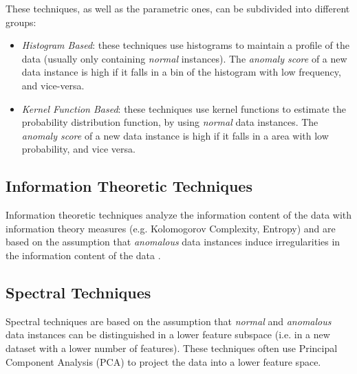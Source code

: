 These techniques, as well as the parametric ones, can be subdivided into different groups:

\begin{itemize}
	\item \textit{Histogram Based}: these techniques use histograms to maintain a profile of the data (usually only containing \textit{normal} instances). The \textit{anomaly score} of a new data instance is high if it falls in a bin of the histogram with low frequency, and vice-versa.
	\item \textit{Kernel Function Based}: these techniques use kernel functions to estimate the probability distribution function, by using \textit{normal} data instances. The \textit{anomaly score} of a new data instance is high if it falls in a area with low probability, and vice versa.
\end{itemize}

\subsection{Information Theoretic Techniques}

Information theoretic techniques analyze the information content of the data with information theory measures (e.g. Kolomogorov Complexity, Entropy) and are based on the assumption that \textit{anomalous} data instances induce irregularities in the information content of the data \cite{Kandhari2009}.

\subsection{Spectral Techniques}

Spectral techniques are based on the assumption that \textit{normal} and \textit{anomalous} data instances can be distinguished in a lower feature subspace (i.e. in a new dataset with a lower number of features). These techniques often use Principal Component Analysis (PCA) \cite{Jolliffe2002} to project the data into a lower feature space.




